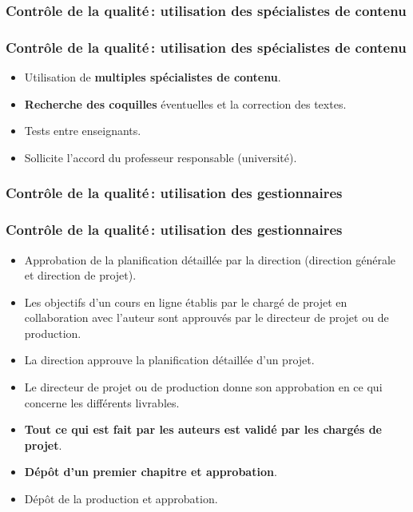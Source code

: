 					\subsubsection{Contrôle de la qualité\,: utilisation des spécialistes de contenu} 
							\begin{frame}
							\frametitle{Contrôle de la qualité\,: utilisation des spécialistes de contenu}
                        			
							\begin{itemize}
							
							\item Utilisation de \textbf{multiples spécialistes de contenu}.
							\item \textbf{Recherche des coquilles} éventuelles et la correction des textes.
							\item Tests entre enseignants.
							\item Sollicite l’accord du professeur responsable (université).
							\end{itemize}						
					\end{frame}	
					
					\subsubsection{Contrôle de la qualité\,: utilisation des gestionnaires} 
							\begin{frame}
							\frametitle{Contrôle de la qualité\,: utilisation des gestionnaires}
                        			
							\begin{itemize}
							\item Approbation de la planification détaillée par la direction (direction générale et direction de projet).
							\item Les objectifs d’un cours en ligne établis par le chargé de projet en collaboration avec l’auteur sont approuvés par le directeur de projet ou de production.
							\item La direction approuve la planification détaillée d’un projet.
							\item Le directeur de projet ou de production donne son approbation en ce qui concerne les différents livrables.
							\item \textbf{Tout ce qui est fait par les auteurs est validé par les chargés de projet}.
							\item \textbf{Dépôt d’un premier chapitre et approbation}.
							\item Dépôt de la production et approbation.
							\end{itemize}						
					\end{frame}	
					
